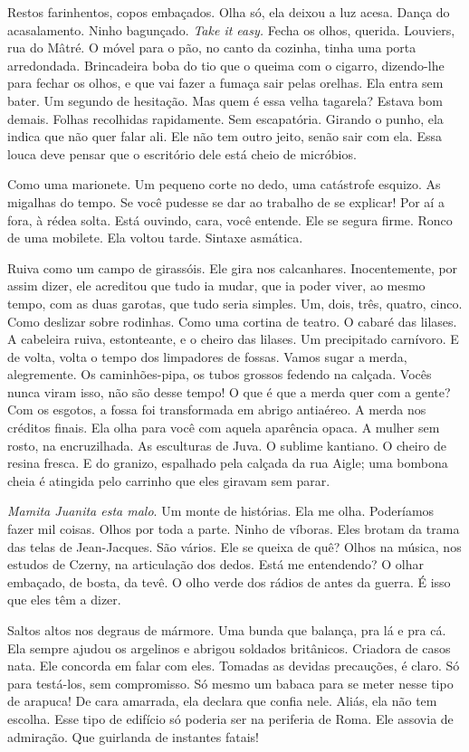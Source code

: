 Restos farinhentos, copos embaçados. Olha só, ela deixou a luz acesa.
Dança do acasalamento. Ninho bagunçado. \emph{Take it easy.} Fecha os
olhos, querida. Louviers, rua do Mâtré. O móvel para o pão, no canto da
cozinha, tinha uma porta arredondada. Brincadeira boba do tio que o
queima com o cigarro, dizendo-lhe para fechar os olhos, e que vai fazer
a fumaça sair pelas orelhas. Ela entra sem bater. Um segundo de
hesitação. Mas quem é essa velha tagarela? Estava bom demais. Folhas
recolhidas rapidamente. Sem escapatória. Girando o punho, ela indica que
não quer falar ali. Ele não tem outro jeito, senão sair com ela. Essa
louca deve pensar que o escritório dele está cheio de micróbios.

Como uma marionete. Um pequeno corte no dedo, uma catástrofe esquizo. As
migalhas do tempo. Se você pudesse se dar ao trabalho de se explicar!
Por aí a fora, à rédea solta. Está ouvindo, cara, você entende. Ele se
segura firme. Ronco de uma mobilete. Ela voltou tarde. Sintaxe asmática.

Ruiva como um campo de girassóis. Ele gira nos calcanhares.
Inocentemente, por assim dizer, ele acreditou que tudo ia mudar, que ia
poder viver, ao mesmo tempo, com as duas garotas, que tudo seria
simples. Um, dois, três, quatro, cinco. Como deslizar sobre rodinhas.
Como uma cortina de teatro. O cabaré das lilases. A cabeleira ruiva,
estonteante, e o cheiro das lilases. Um precipitado carnívoro. E de
volta, volta o tempo dos limpadores de fossas. Vamos sugar a merda,
alegremente. Os caminhões-pipa, os tubos grossos fedendo na calçada.
Vocês nunca viram isso, não são desse tempo! O que é que a merda quer
com a gente? Com os esgotos, a fossa foi transformada em abrigo
antiaéreo. A merda nos créditos finais. Ela olha para você com aquela
aparência opaca. A mulher sem rosto, na encruzilhada. As esculturas de
Juva. O sublime kantiano. O cheiro de resina fresca. E do granizo,
espalhado pela calçada da rua Aigle; uma bombona cheia é atingida pelo
carrinho que eles giravam sem parar.

\emph{Mamita Juanita esta malo}. Um monte de histórias. Ela me olha.
Poderíamos fazer mil coisas. Olhos por toda a parte. Ninho de víboras.
Eles brotam da trama das telas de Jean-Jacques. São vários. Ele se
queixa de quê? Olhos na música, nos estudos de Czerny, na articulação
dos dedos. Está me entendendo? O olhar embaçado, de bosta, da tevê. O
olho verde dos rádios de antes da guerra. É isso que eles têm a dizer.

Saltos altos nos degraus de mármore. Uma bunda que balança, pra lá e pra
cá. Ela sempre ajudou os argelinos e abrigou soldados britânicos.
Criadora de casos nata. Ele concorda em falar com eles. Tomadas as
devidas precauções, é claro. Só para testá-los, sem compromisso. Só
mesmo um babaca para se meter nesse tipo de arapuca! De cara amarrada,
ela declara que confia nele. Aliás, ela não tem escolha. Esse tipo de
edifício só poderia ser na periferia de Roma. Ele assovia de admiração.
Que guirlanda de instantes fatais!

